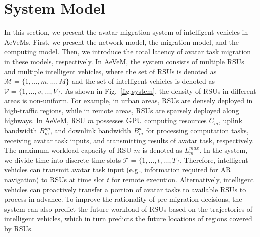 \documentclass[lettersize,journal]{IEEEtran}
\begin{document}


\section{System Model} \label{system}

In this section, we present the avatar migration system of intelligent vehicles in AeVeMs. First, we present the network model, the migration model, and the computing model. Then, we introduce the total latency of avatar task migration in these models, respectively.
In AeVeM, the system consists of multiple RSUs and multiple intelligent vehicles, where the set of RSUs is denoted as $\mathcal{M}={\{1,\dots, m, \dots, M\}}$ and the set of intelligent vehicles is denoted as $\mathcal{V}={\{1,\dots, v,\dots, V\}}$. As shown in Fig.~\ref{fig:system}, the density of RSUs in different areas is non-uniform. For example, in urban areas, RSUs are densely deployed in high-traffic regions, while in remote areas, RSUs are sparsely deployed along highways. In AeVeM, RSU $m$ possesses GPU computing resources $C_m$, uplink bandwidth $B_m^{up}$, and downlink bandwidth $B_m^{d}$ for processing computation tasks, receiving avatar task inputs, and transmitting results of avatar task, respectively. The maximum workload capacity of RSU $m$ is denoted as $L_m^{max}$. In the system, we divide time into discrete time slots $\mathcal{T}=\{1,\dots, t,\dots, T\}$. Therefore, intelligent vehicles can transmit avatar task input (e.g., information required for AR navigation) to RSUs at time slot $t$ for remote execution. Alternatively, intelligent vehicles can proactively transfer a portion of avatar tasks to available RSUs to process in advance. To improve the rationality of pre-migration decisions, the system can also predict the future workload of RSUs based on the trajectories of intelligent vehicles, which in turn predicts the future locations of regions covered by RSUs.
\end{document}
